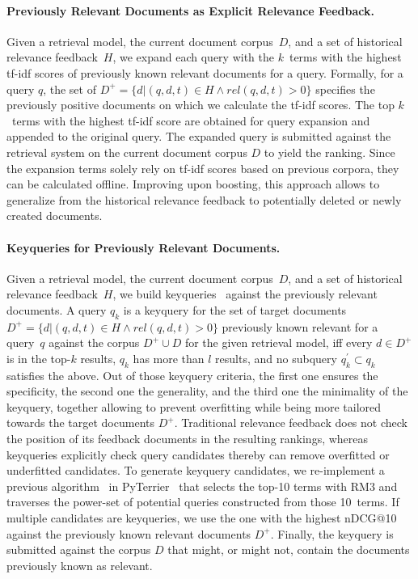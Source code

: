 \paragraph{Previously Relevant Documents as Explicit Relevance Feedback.} Given a retrieval model, the current document corpus~$D$, and a set of historical relevance feedback~$H$, we expand each query with the $k$~terms with the highest tf-idf scores of previously known relevant documents for a query. Formally, for a query $q$, the set of $D^{+} = \{d| (q,d,t) \in H \wedge rel(q,d,t) > 0\}$ specifies the previously positive documents on which we calculate the tf-idf scores. The top $k$~terms with the highest tf-idf score are obtained for query expansion and appended to the original query. The expanded query is submitted against the retrieval system on the current document corpus $D$ to yield the ranking. Since the expansion terms solely rely on tf-idf scores based on  previous corpora, they can be calculated offline. Improving upon boosting, this approach allows to generalize from the historical relevance feedback to potentially deleted or newly created documents. 


\paragraph{Keyqueries for Previously Relevant Documents.} Given a retrieval model, the current document corpus~$D$, and a set of historical relevance feedback~$H$, we build keyqueries~\cite{froebe:2021c,gollub:2013a,hagen:2016b} against the previously relevant documents. A query $q_{k}$ is a keyquery for the set of target documents $D^{+} = \{d| (q,d,t) \in H \wedge rel(q,d,t) > 0\}$ previously known relevant for a query~$q$ against the corpus $D^{+} \cup D$ for the given retrieval model, iff \Ni every $d \in D^{+}$ is in the top-$k$ results, \Nii $q_{k}$ has more than $l$ results, and \Niii no subquery $q^{'}_{k} \subset q_{k}$ satisfies the above. Out of those keyquery criteria, the first one ensures the specificity, the second one the generality, and the third one the minimality of the keyquery, together allowing to prevent overfitting while being more tailored towards the target documents $D^{+}$. Traditional relevance feedback does not check the position of its feedback documents in the resulting rankings, whereas keyqueries explicitly check query candidates thereby can remove overfitted or underfitted candidates. To generate keyquery candidates, we re-implement a previous algorithm~\cite{froebe:2022c} in PyTerrier~\cite{macdonald:2020} that selects the top-10 terms with RM3 and traverses the power-set of potential queries constructed from those 10~terms. If multiple candidates are keyqueries, we use the one with the highest nDCG@10 against the previously known relevant documents $D^{+}$. Finally, the keyquery is submitted against the corpus $D$ that might, or might not, contain the documents previously known as relevant.

